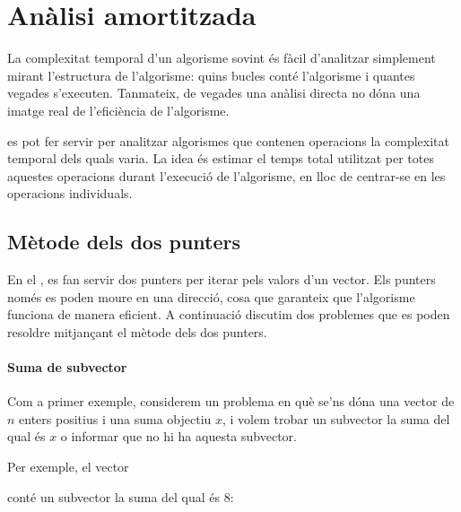 \chapter{Anàlisi amortitzada}


La complexitat temporal d'un algorisme sovint és fàcil d'analitzar
simplement mirant l'estructura de l'algorisme: quins bucles conté
l'algorisme i quantes vegades s'executen. Tanmateix, de
vegades una anàlisi directa no dóna una imatge real de l'eficiència
de l'algorisme.

 es pot fer servir per analitzar algorismes
que contenen operacions la complexitat temporal dels quals varia. La
idea és estimar el temps total utilitzat per totes aquestes
operacions durant l'execució de l'algorisme, en lloc de centrar-se en
les operacions individuals.

\section{Mètode dels dos punters}


En el , es fan servir dos punters per iterar
pels valors d'un vector. Els punters només es poden moure en una
direcció, cosa que garanteix que l'algorisme funciona de manera
eficient. A continuació discutim dos problemes que es poden resoldre
mitjançant el mètode dels dos punters.

\subsubsection{Suma de subvector}

Com a primer exemple, considerem un problema en què se'ns dóna una
vector de $n$ enters positius i una suma objectiu $x$, i volem trobar
un subvector la suma del qual és $x$ o informar que no hi ha aquesta
subvector.

Per exemple, el vector
\begin{center}
\end{center}
conté un subvector la suma del qual és 8:
\begin{center}
\end{center}


